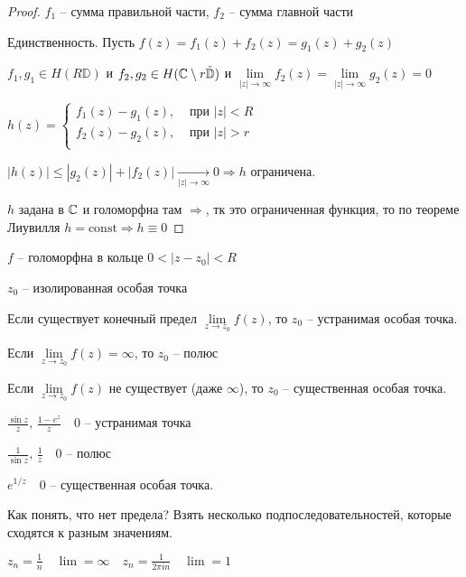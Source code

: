 \begin{proof}\thmslashn
	
	$f_1$ -- сумма правильной части, $f_2$ -- сумма главной части
	
	Единственность. Пусть $f(z) = f_1(z) + f_2(z) = g_1(z) + g_2(z)$
	
	$f_1, g_1 \in H(R\mathbb{D})$ и $f_2, g_2 \in H(\mathbb{C} \setminus r \tilde{\mathbb{D}})$ и $\lim\limits_{|z| \to \infty} f_2(z) = \lim\limits_{|z| \to \infty} g_2(z) = 0$
	
	$h(z) = \begin{cases}
	f_1(z) - g_1(z), & \text{ при } |z| < R\\
	f_2(z) - g_2(z), & \text{ при } |z| > r\\
	\end{cases}$
	
	$|h(z)| \leqslant |g_2(z)| + |f_2(z)| \underset{|z|\to \infty}\to 0 \Rightarrow h$ ограничена. 
	
	$h$ задана в $\mathbb{C}$ и голоморфна там $\Rightarrow$, тк это ограниченная функция, то по теореме Лиувилля $h = \text{const} \Rightarrow h \equiv 0$
	
\end{proof}

\begin{definition}\thmslashn

	$f$ -- голоморфна в кольце $0 < |z - z_0| < R$

	$z_0$ -- изолированная особая точка
	
	Если существует конечный предел $\lim\limits_{z \to z_0} f(z)$, то $z_0$ -- устранимая особая точка.
	
	Если $\lim\limits_{z \to z_0} f(z) = \infty$, то $z_0$ -- полюс
	
	Если $\lim\limits_{z \to z_0} f(z)$ не существует (даже $\infty$), то $z_0$ -- существенная особая точка.
	
\end{definition}

\begin{example}\thmslashn
	
	$\frac{\sin z}{z}, \, \frac{1-e^z}{z} \quad 0$ -- устранимая точка 
	
	$\frac{1}{\sin z}, \, \frac{1}{z}\quad 0$ -- полюс
	
	$e^{1/z} \quad 0$ -- существенная особая точка.
	
	Как понять, что нет предела? Взять несколько подпоследовательностей, которые сходятся к разным значениям.
	
	$z_n = \frac{1}{n}\quad \lim = \infty \quad z_n = \frac{1}{2\pi i n} \quad \lim = 1$
	
\end{example}

